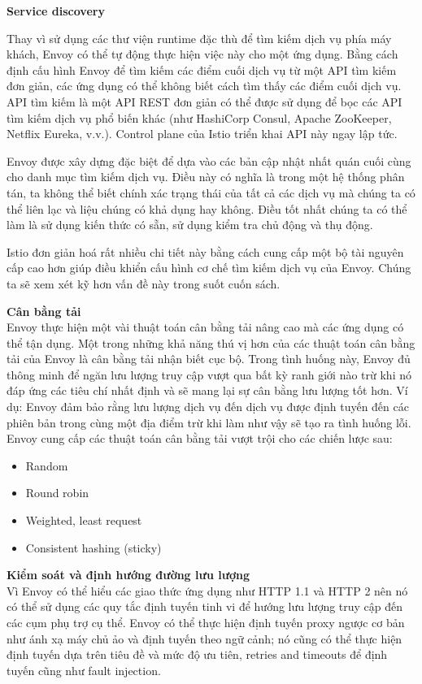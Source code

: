 \documentclass[12pt,a4paper]{report}
\begin{document}
		\textbf{Service discovery}
		
		Thay vì sử dụng các thư viện runtime đặc thù để tìm kiếm dịch vụ phía máy khách, Envoy có thể tự động thực hiện việc này cho một ứng dụng. Bằng cách định cấu hình Envoy để tìm kiếm các điểm cuối dịch vụ từ một API tìm kiếm đơn giản, các ứng dụng có thể không biết cách tìm thấy các điểm cuối dịch vụ. API tìm kiếm là một API REST đơn giản có thể được sử dụng để bọc các API tìm kiếm dịch vụ phổ biến khác (như HashiCorp Consul, Apache ZooKeeper, Netflix Eureka, v.v.). Control plane của Istio triển khai API này ngay lập tức.
		
		Envoy được xây dựng đặc biệt để dựa vào các bản cập nhật nhất quán cuối cùng cho danh mục tìm kiếm dịch vụ. Điều này có nghĩa là trong một hệ thống phân tán, ta không thể biết chính xác trạng thái của tất cả các dịch vụ mà chúng ta có thể liên lạc và liệu chúng có khả dụng hay không. Điều tốt nhất chúng ta có thể làm là sử dụng kiến thức có sẵn, sử dụng kiểm tra chủ động và thụ động.
		
		Istio đơn giản hoá rất nhiều chi tiết này bằng cách cung cấp một bộ tài nguyên cấp cao hơn giúp điều khiển cấu hình cơ chế tìm kiếm dịch vụ của Envoy. Chúng ta sẽ xem xét kỹ hơn vấn đề này trong suốt cuốn sách.
		
		\textbf{Cân bằng tải}\\
		\hspace{0.6cm}Envoy thực hiện một vài thuật toán cân bằng tải nâng cao mà các ứng dụng có thể tận dụng. Một trong những khả năng thú vị hơn của các thuật toán cân bằng tải của Envoy là cân bằng tải nhận biết cục bộ. Trong tình huống này, Envoy đủ thông minh để ngăn lưu lượng truy cập vượt qua bất kỳ ranh giới nào trừ khi nó đáp ứng các tiêu chí nhất định và sẽ mang lại sự cân bằng lưu lượng tốt hơn. Ví dụ: Envoy đảm bảo rằng lưu lượng dịch vụ đến dịch vụ được định tuyến đến các phiên bản trong cùng một địa điểm trừ khi làm như vậy sẽ tạo ra tình huống lỗi. Envoy cung cấp các thuật toán cân bằng tải vượt trội cho các chiến lược sau:
		\begin{itemize}
			\item 		Random
			\item 		Round robin
			\item 		Weighted, least request
			\item 		Consistent hashing (sticky) 
		\end{itemize}		
		
		\textbf{Kiểm soát và định hướng đường lưu lượng}\\
		Vì Envoy có thể hiểu các giao thức ứng dụng như HTTP 1.1 và HTTP 2 nên nó có thể sử dụng các quy tắc định tuyến tinh vi để hướng lưu lượng truy cập đến các cụm phụ trợ cụ thể. Envoy có thể thực hiện định tuyến proxy ngược cơ bản như ánh xạ máy chủ ảo và định tuyến theo ngữ cảnh; nó cũng có thể thực hiện định tuyến dựa trên tiêu đề và mức độ ưu tiên, retries and timeouts để định tuyến cũng như fault injection.
		
\end{document}
